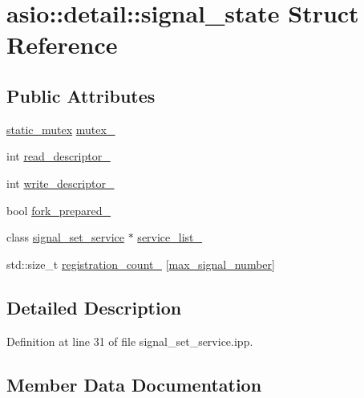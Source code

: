 \hypertarget{structasio_1_1detail_1_1signal__state}{}\section{asio\+:\+:detail\+:\+:signal\+\_\+state Struct Reference}
\label{structasio_1_1detail_1_1signal__state}
\subsection*{Public Attributes}
\begin{DoxyCompactItemize}
\item 
\hyperlink{namespaceasio_1_1detail_a7c96c5c11c31acb79c355cdbcf4d069a}{static\+\_\+mutex} \hyperlink{structasio_1_1detail_1_1signal__state_a054651e15a26059bebfacafcc3ad8b60}{mutex\+\_\+}
\item 
int \hyperlink{structasio_1_1detail_1_1signal__state_a8dd0b39c1526c576070ea3cd2a9a8e48}{read\+\_\+descriptor\+\_\+}
\item 
int \hyperlink{structasio_1_1detail_1_1signal__state_a3c979ca2050daff239c9882150869d19}{write\+\_\+descriptor\+\_\+}
\item 
bool \hyperlink{structasio_1_1detail_1_1signal__state_a51406a76cd24c7c0003eb5d01ea640a1}{fork\+\_\+prepared\+\_\+}
\item 
class \hyperlink{classasio_1_1detail_1_1signal__set__service}{signal\+\_\+set\+\_\+service} $\ast$ \hyperlink{structasio_1_1detail_1_1signal__state_ad3a5677437674270e46cf8a642d29b0e}{service\+\_\+list\+\_\+}
\item 
std\+::size\+\_\+t \hyperlink{structasio_1_1detail_1_1signal__state_afeeb1dcf109939a4d0cd91359c62f7e2}{registration\+\_\+count\+\_\+} \mbox{[}\hyperlink{namespaceasio_1_1detail_a8ce9598d4b88a6eaca79522f8a4572f5a74aea376792d8d6e668d48a0acc144e2}{max\+\_\+signal\+\_\+number}\mbox{]}
\end{DoxyCompactItemize}


\subsection{Detailed Description}


Definition at line 31 of file signal\+\_\+set\+\_\+service.\+ipp.



\subsection{Member Data Documentation}
\hypertarget{structasio_1_1detail_1_1signal__state_a51406a76cd24c7c0003eb5d01ea640a1}{}
